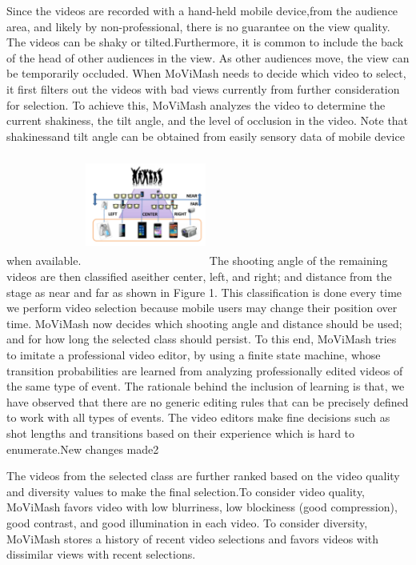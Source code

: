 \documentclass{sig-alternate}
\begin{document}
Since the videos are recorded with a hand-held mobile device,from the audience area, and likely by non-professional, there is no guarantee on the view quality. The videos can be shaky or tilted.Furthermore, it is common to include the back of the head of other audiences in the view. As other audiences move, the view can be temporarily occluded. When MoViMash needs to decide which video to select, it first filters out the videos with bad views currently from further consideration for selection. To achieve this, MoViMash analyzes the video to determine the current shakiness, the tilt angle, and the level of occlusion in the video. Note that shakinessand tilt angle can be obtained from easily sensory data of mobile device when available.
\includegraphics[width=4cm, height=4cm]{img1.png}
The shooting angle of the remaining videos are then classified aseither center, left, and right; and distance from the stage as near and far as shown in Figure 1. This classification is done every time we perform video selection because mobile users may change their position over time. MoViMash now decides which shooting angle and distance should be used; and for how long the selected class should persist. To this end, MoViMash tries to imitate a professional video editor, by using a finite state machine, whose transition probabilities are learned from analyzing professionally edited videos of the same type of event. The rationale behind the inclusion of learning is that, we have observed that there are no generic editing rules that can be precisely defined to work with all types of events. The video editors make fine decisions such as shot lengths and transitions based on their experience which is hard to enumerate.New changes made2

The videos from the selected class are further ranked based on the video quality and diversity values to make the final selection.To consider video quality, MoViMash favors video with low blurriness, low blockiness (good compression), good contrast, and good illumination in each video. To consider diversity, MoViMash stores a history of recent video selections and favors videos with dissimilar views with recent selections.
\end{document}
